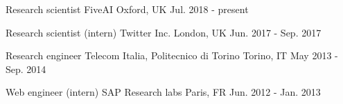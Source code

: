 

\begin{cvjobs}
  \cvjob
    {Research scientist} %
    {FiveAI} %
    {Oxford, UK} %
    {Jul. 2018 - present} %
    {
    }


  \cvjob
    {Research scientist (intern)} %
    {Twitter Inc.} %
    {London, UK} %
    {Jun. 2017 - Sep. 2017} %

  \cvjob
    {Research engineer} %
    {Telecom Italia, Politecnico di Torino} %
    {Torino, IT} %
    {May 2013 - Sep. 2014} %

  \cvjob
    {Web engineer (intern)} %
    {SAP Research labs} %
    {Paris, FR} %
    {Jun. 2012 - Jan. 2013} %
    
\end{cvjobs}
